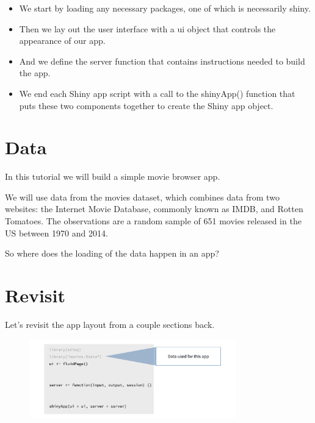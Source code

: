 \documentclass[
  letterpaper,
  DIV=11,
  numbers=noendperiod]{scrreprt}
\begin{document}
\begin{itemize}
\item
  We start by loading any necessary packages, one of which is
  necessarily shiny.
\item
  Then we lay out the user interface with a ui object that controls the
  appearance of our app.
\item
  And we define the server function that contains instructions needed to
  build the app.
\item
  We end each Shiny app script with a call to the shinyApp() function
  that puts these two components together to create the Shiny app
  object.
\end{itemize}

\hypertarget{data}{%
\section{Data}\label{data}}

In this tutorial we will build a simple movie browser app.

We will use data from the movies dataset, which combines data from two
websites: the Internet Movie Database, commonly known as IMDB, and
Rotten Tomatoes. The observations are a random sample of 651 movies
released in the US between 1970 and 2014.

So where does the loading of the data happen in an app?

\hypertarget{revisit}{%
\section{Revisit}\label{revisit}}

Let's revisit the app layout from a couple sections back.

\begin{figure}

{\centering \includegraphics[width=0.8\textwidth,height=\textheight]{./images/revisit.png}

}

\end{figure}
\end{document}
